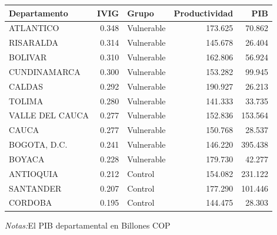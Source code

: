 \documentclass[12pt]{article}
\begin{document}
\setcounter{table}{6}
\begin{table}[htbp]
\centering
\begin{threeparttable}

\begin{tabular}{lrlrr}
\toprule
Departamento & IVIG & Grupo & Productividad & PIB\\
\midrule
ATLANTICO & 0.348 & Vulnerable & 173.625 & 70.862\\
RISARALDA & 0.314 & Vulnerable & 145.678 & 26.404\\
BOLIVAR & 0.310 & Vulnerable & 162.806 & 56.924\\
CUNDINAMARCA & 0.300 & Vulnerable & 153.282 & 99.945\\
CALDAS & 0.292 & Vulnerable & 190.927 & 26.213\\
\addlinespace
TOLIMA & 0.280 & Vulnerable & 141.333 & 33.735\\
VALLE DEL CAUCA & 0.277 & Vulnerable & 152.836 & 153.564\\
CAUCA & 0.277 & Vulnerable & 150.768 & 28.537\\
BOGOTA, D.C. & 0.241 & Vulnerable & 146.220 & 395.438\\
BOYACA & 0.228 & Vulnerable & 179.730 & 42.277\\
\addlinespace
ANTIOQUIA & 0.212 & Control & 154.082 & 231.122\\
SANTANDER & 0.207 & Control & 177.290 & 101.446\\
CORDOBA & 0.195 & Control & 144.475 & 28.303\\
\bottomrule
\end{tabular}
\begin{tablenotes}
\footnotesize
\item \textit{Notas:}El PIB departamental en Billones COP
\end{tablenotes}
\end{threeparttable}
\end{table}
\end{document}
